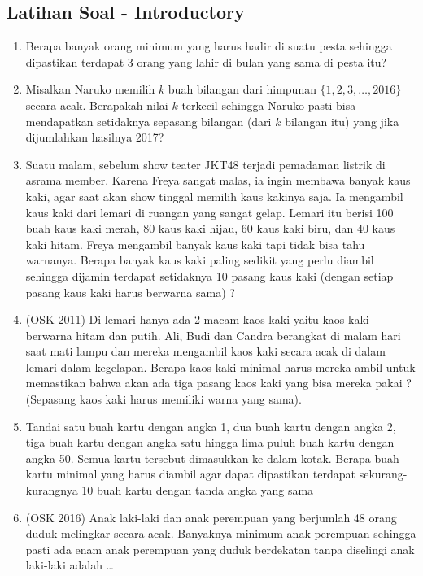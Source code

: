 \documentclass[12pt]{scrartcl}
\begin{document}
\subsection{Latihan Soal - Introductory}
\begin{enumerate}
\item Berapa banyak orang minimum yang harus hadir di suatu pesta sehingga dipastikan terdapat 3 orang yang lahir di bulan yang sama di pesta itu?

\item Misalkan Naruko memilih $k$ buah bilangan dari himpunan $\{1,2,3,\dots,2016\}$ secara acak. Berapakah nilai $k$ terkecil sehingga Naruko pasti bisa mendapatkan setidaknya sepasang bilangan (dari $k$ bilangan itu) yang jika dijumlahkan hasilnya 2017?

\item Suatu malam, sebelum show teater JKT48 terjadi pemadaman listrik di asrama member. Karena Freya sangat malas, ia ingin membawa banyak kaus kaki, agar saat akan show tinggal memilih kaus kakinya saja. Ia mengambil kaus kaki dari lemari di ruangan yang sangat gelap. Lemari itu berisi 100 buah kaus kaki merah, 80 kaus kaki hijau, 60 kaus kaki biru, dan 40 kaus kaki hitam. Freya mengambil banyak kaus kaki tapi tidak bisa tahu warnanya. Berapa banyak kaus kaki paling sedikit yang perlu diambil sehingga dijamin terdapat setidaknya 10 pasang kaus kaki (dengan setiap pasang kaus kaki harus berwarna sama) ?

\item (OSK 2011) Di lemari hanya ada 2 macam kaos kaki yaitu kaos kaki berwarna hitam dan putih. Ali, Budi dan Candra berangkat di malam hari saat mati lampu dan mereka mengambil kaos kaki secara acak di dalam lemari dalam kegelapan. Berapa kaos kaki minimal harus mereka ambil untuk memastikan bahwa akan ada tiga pasang kaos kaki yang bisa mereka pakai ? (Sepasang kaos kaki harus memiliki warna yang sama).
    
\item Tandai satu buah kartu dengan angka 1, dua buah kartu dengan angka 2, tiga buah kartu dengan angka satu hingga lima puluh buah kartu dengan angka 50. Semua kartu tersebut dimasukkan ke dalam kotak. Berapa buah kartu minimal yang harus diambil agar dapat dipastikan terdapat sekurang-kurangnya 10 buah kartu dengan tanda angka yang sama 

\item (OSK 2016) Anak laki-laki dan anak perempuan yang berjumlah 48 orang duduk melingkar secara acak. Banyaknya minimum anak perempuan sehingga pasti ada enam anak perempuan yang duduk berdekatan tanpa diselingi anak laki-laki adalah \dots
\end{enumerate}
\end{document}

